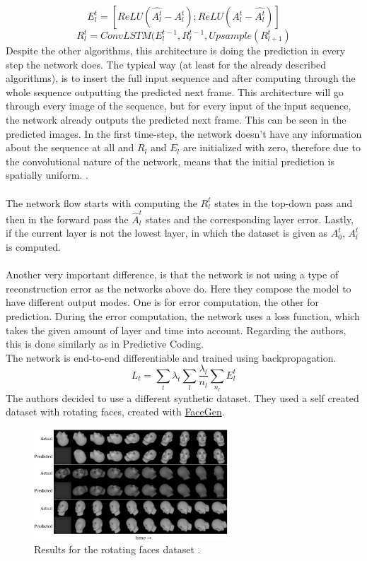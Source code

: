   \begin{equation}
   E_l^t = [ReLU(\hat{A_l^t} - A_l^t); ReLU(A_l^t - \hat{A_l^t})]
  \end{equation}
  \begin{equation}
   R_l^t = ConvLSTM(E_l^{t-1}, R_l^{t-1}, Upsample(R_{l+1}^t)
  \end{equation}\noindent
 Despite the other algorithms, this architecture is doing the prediction in every step the network does. The typical way (at least for the already described 
 algorithms), is to insert the full input sequence and after computing through the whole sequence outputting the predicted next frame. This architecture will go
 through every image of the sequence, but for every input of the input sequence, the network already outputs the predicted next frame. This can be seen in the
 predicted images. In the first time-step, the network doesn't have any information about the sequence at all and $R_l$ and $E_l$ are initialized with zero, 
 therefore \glqq [\ldots] due to the convolutional nature of the network, means that the initial prediction is spatially uniform.\grqq{} \cite{Lotter2016}.
 \\\\
 The network flow starts with computing the $R_l^t$ states in the top-down pass and then in the forward pass the $\hat{A}_l^t$ states and the corresponding
 layer error. Lastly, if the current layer is not the lowest layer, in which the dataset is given as $A_0^t$, $A_{l}^t$ is computed.
 \\\\
 Another very important difference, is that the network is not using a type of reconstruction error as the networks above do. Here they compose the model to
 have different output modes. One is for error computation, the other for prediction. During the error computation, the network uses a loss function, which takes
 the given amount of layer and time into account. Regarding the authors, this is done similarly as in Predictive Coding.\\
 The network is end-to-end differentiable and trained using backpropagation.
 \begin{equation}
  L_t = \sum_{t}\lambda_t \sum_l \frac{\lambda_l}{n_l} \sum_{n_l}E_l^t
 \end{equation}
 The authors decided to use a different synthetic dataset. They used a self created dataset with rotating faces, created with \href{https://facegen.com/}
 {FaceGen}.
 \begin{figure}[H]
   \includegraphics[width=0.65\textwidth]{../Images/prednet.png}
   \centering
   \caption{Results for the rotating faces dataset \cite{Lotter2016}.}
   \label{fig:lotter_rotation}
 \end{figure}\noindent
